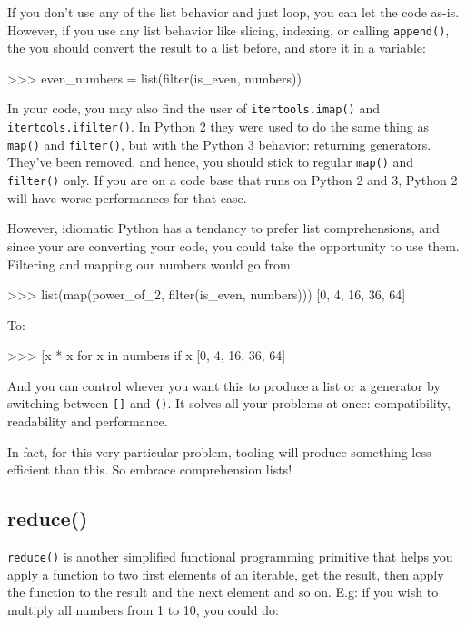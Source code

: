 If you don't use any of the list behavior and just loop, you can let the code as-is. However, if you use any list behavior like slicing, indexing, or calling \lstinline{append()}, the you should convert the result to a list before, and store it in a variable:

\begin{py2and3}
>>> even_numbers = list(filter(is_even, numbers))
\end{py2and3}

In your code, you may also find the user of \lstinline{itertools.imap()} and \lstinline{itertools.ifilter()}. In Python 2 they were used to do the same thing as \lstinline{map()} and \lstinline{filter()}, but with the Python 3 behavior: returning generators. They've been removed, and hence, you should stick to regular \lstinline{map()} and \lstinline{filter()} only. If you are on a code base that runs on Python 2 and 3, Python 2 will have worse performances for that case.

However, idiomatic Python has a tendancy to prefer \glspl{list comprehension}, and since your are converting your code, you could take the opportunity to use them. Filtering and mapping our numbers would go from:

\begin{py2and3}
>>> list(map(power_of_2, filter(is_even, numbers)))
[0, 4, 16, 36, 64]
\end{py2and3}

To:

\begin{py2and3}
>>> [x * x for x in numbers if x %
[0, 4, 16, 36, 64]
\end{py2and3}

And you can control whever you want this to produce a list or a generator by switching between \lstinline{[]} and \lstinline{()}. It solves all your problems at once: compatibility, readability and performance.

In fact, for this very particular problem, tooling will produce something less efficient than this. So embrace comprehension lists!

\subsection{reduce()}

\lstinline{reduce()} is another simplified functional programming primitive that helps you apply a function to two first elements of an iterable, get the result, then apply the function to the result and the next element and so on. E.g: if you wish to multiply all numbers from 1 to 10, you could do:

